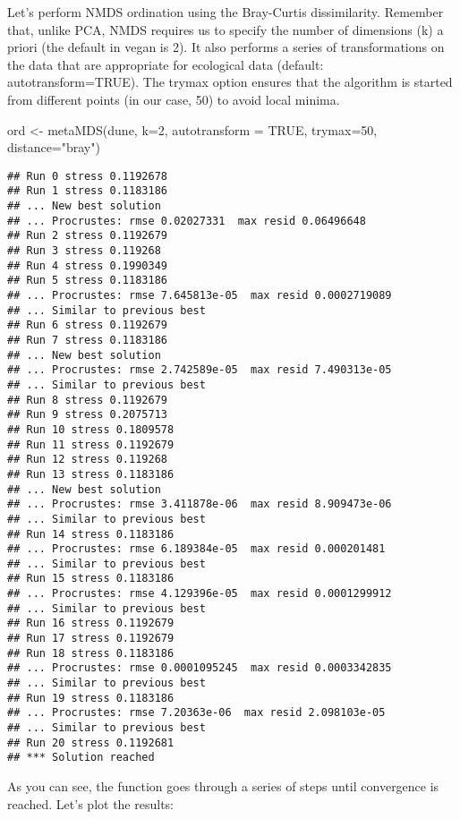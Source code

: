 \documentclass[
]{book}
\newenvironment{Shaded}{\begin{snugshade}}{\end{snugshade}}
\newcommand{\AttributeTok}[1]{\textcolor[rgb]{0.77,0.63,0.00}{#1}}
\newcommand{\ConstantTok}[1]{\textcolor[rgb]{0.00,0.00,0.00}{#1}}
\newcommand{\DecValTok}[1]{\textcolor[rgb]{0.00,0.00,0.81}{#1}}
\newcommand{\FunctionTok}[1]{\textcolor[rgb]{0.00,0.00,0.00}{#1}}
\newcommand{\NormalTok}[1]{#1}
\newcommand{\OtherTok}[1]{\textcolor[rgb]{0.56,0.35,0.01}{#1}}
\newcommand{\StringTok}[1]{\textcolor[rgb]{0.31,0.60,0.02}{#1}}
\begin{document}
Let's perform NMDS ordination using the Bray-Curtis dissimilarity. Remember that, unlike PCA, NMDS requires us to specify the number of dimensions (k) a priori (the default in vegan is 2). It also performs a series of transformations on the data that are appropriate for ecological data (default: autotransform=TRUE). The trymax option ensures that the algorithm is started from different points (in our case, 50) to avoid local minima.

\begin{Shaded}
\begin{Highlighting}[]
\NormalTok{ord }\OtherTok{\textless{}{-}} \FunctionTok{metaMDS}\NormalTok{(dune, }\AttributeTok{k=}\DecValTok{2}\NormalTok{, }\AttributeTok{autotransform =} \ConstantTok{TRUE}\NormalTok{, }\AttributeTok{trymax=}\DecValTok{50}\NormalTok{, }\AttributeTok{distance=}\StringTok{"bray"}\NormalTok{)}
\end{Highlighting}
\end{Shaded}

\begin{verbatim}
## Run 0 stress 0.1192678 
## Run 1 stress 0.1183186 
## ... New best solution
## ... Procrustes: rmse 0.02027331  max resid 0.06496648 
## Run 2 stress 0.1192679 
## Run 3 stress 0.119268 
## Run 4 stress 0.1990349 
## Run 5 stress 0.1183186 
## ... Procrustes: rmse 7.645813e-05  max resid 0.0002719089 
## ... Similar to previous best
## Run 6 stress 0.1192679 
## Run 7 stress 0.1183186 
## ... New best solution
## ... Procrustes: rmse 2.742589e-05  max resid 7.490313e-05 
## ... Similar to previous best
## Run 8 stress 0.1192679 
## Run 9 stress 0.2075713 
## Run 10 stress 0.1809578 
## Run 11 stress 0.1192679 
## Run 12 stress 0.119268 
## Run 13 stress 0.1183186 
## ... New best solution
## ... Procrustes: rmse 3.411878e-06  max resid 8.909473e-06 
## ... Similar to previous best
## Run 14 stress 0.1183186 
## ... Procrustes: rmse 6.189384e-05  max resid 0.000201481 
## ... Similar to previous best
## Run 15 stress 0.1183186 
## ... Procrustes: rmse 4.129396e-05  max resid 0.0001299912 
## ... Similar to previous best
## Run 16 stress 0.1192679 
## Run 17 stress 0.1192679 
## Run 18 stress 0.1183186 
## ... Procrustes: rmse 0.0001095245  max resid 0.0003342835 
## ... Similar to previous best
## Run 19 stress 0.1183186 
## ... Procrustes: rmse 7.20363e-06  max resid 2.098103e-05 
## ... Similar to previous best
## Run 20 stress 0.1192681 
## *** Solution reached
\end{verbatim}

As you can see, the function goes through a series of steps until convergence is reached. Let's plot the results:
\end{document}
